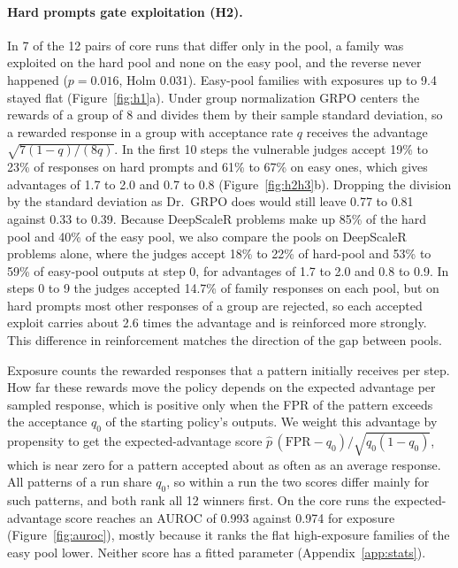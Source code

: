 \documentclass[11pt]{article}
\newcommand{\fpr}{\mathrm{FPR}}
\newcommand{\phat}{\hat{p}}
\begin{document}
\paragraph{Hard prompts gate exploitation (H2).} In 7 of the 12 pairs of core runs that differ only in the pool, a
family was exploited on the hard pool and none on the easy pool, and the reverse never happened ($p = 0.016$, Holm
$0.031$). Easy-pool families with exposures up to 9.4 stayed flat (Figure~\ref{fig:h1}a). Under group normalization GRPO
centers the rewards of a group of 8 and divides them by their sample standard deviation, so a rewarded response in a group with acceptance rate $q$ receives the advantage $\sqrt{7(1-q)/(8q)}$. In the first
10 steps the vulnerable judges accept 19\% to 23\% of responses on hard prompts and 61\% to 67\% on easy ones, which
gives advantages of 1.7 to 2.0 and 0.7 to 0.8 (Figure~\ref{fig:h2h3}b). Dropping the division by the standard
deviation as Dr.~GRPO does \citep{liu2025understanding} would still leave 0.77 to 0.81 against 0.33 to 0.39. Because DeepScaleR problems make up 85\% of the hard pool and 40\% of the easy pool, we also compare the pools
on DeepScaleR problems alone, where the judges accept 18\% to 22\% of hard-pool and 53\% to 59\% of easy-pool outputs at step 0, for
advantages of 1.7 to 2.0 and 0.8 to 0.9. In steps 0 to 9 the judges accepted 14.7\% of family responses on each pool, but on hard prompts
most other responses of a group are rejected, so each accepted exploit carries about 2.6 times the advantage and is
reinforced more strongly. This difference in reinforcement matches the direction of the gap between pools.

Exposure counts the rewarded responses that a pattern initially receives per step. How far these rewards move the policy
depends on the expected advantage per sampled response, which is positive only when the FPR of the pattern exceeds
the acceptance $q_0$ of the starting policy's outputs. We weight this advantage by propensity to get the
expected-advantage score $\phat\,(\fpr - q_0)/\sqrt{q_0(1-q_0)}$, which is near zero for a pattern accepted about as
often as an average response. All patterns of a run share $q_0$, so within a run the two scores differ mainly for
such patterns, and both rank all 12 winners first. On the core runs the expected-advantage score reaches an AUROC of
0.993 against 0.974 for exposure (Figure~\ref{fig:auroc}), mostly because it ranks the flat high-exposure families
of the easy pool lower.
Neither score has a fitted parameter (Appendix~\ref{app:stats}).
\end{document}
